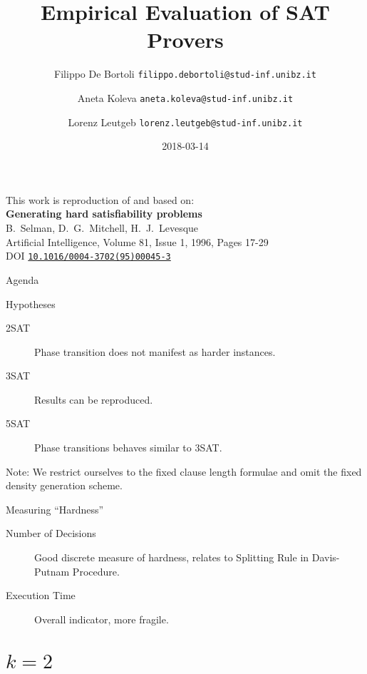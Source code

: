 \documentclass[xcolor={table,usenames,dvipsnames}]{beamer}
\title{Empirical Evaluation of SAT Provers}
\author{Filippo De Bortoli \texorpdfstring{\newline \texttt{\tiny filippo.debortoli@stud-inf.unibz.it} \newline }{<filippo.debortoli@stud-inf.unibz.it>}%
\and Aneta Koleva \texorpdfstring{\newline \texttt{\tiny aneta.koleva@stud-inf.unibz.it} \newline}{<aneta.koleva@stud-inf.unibz.it>}%
\and Lorenz Leutgeb \texorpdfstring{\newline \texttt{\tiny lorenz.leutgeb@stud-inf.unibz.it} \newline}{<lorenz.leutgeb@stud-inf.unibz.it>}}
\institute{Free University of Bozen-Bolzano}
\date{2018-03-14}
\begin{document}
\begin{frame}[plain]
\maketitle
\end{frame}

\begin{frame}[plain]
This work is reproduction of and based on:\\[3mm]

{\large\bfseries Generating hard satisfiability problems}\\[1mm]
B.\ Selman, D.\ G.\ Mitchell, H.\ J.\ Levesque\\[2mm]
Artificial Intelligence, Volume 81, Issue 1, 1996, Pages 17-29\\[1mm]
DOI \href{http://dx.doi.org/10.1016/0004-3702(95)00045-3}{\texttt{10.1016/0004-3702(95)00045-3}}\\[3mm]
{\small \color{gray}{(detailed reference in the end)}}
\end{frame}

\begin{frame}{Agenda}
\tableofcontents
\end{frame}

\begin{frame}{Hypotheses}
\begin{description}
	\item[2SAT]{Phase transition does not manifest as harder instances.}
    \item[3SAT]{Results can be reproduced.}
    \item[5SAT]{Phase transitions behaves similar to 3SAT.}
\end{description}

\alert{Note:} We restrict ourselves to the fixed clause length formulae and omit the fixed density generation scheme.
\end{frame}

\begin{frame}{Measuring \enquote{Hardness}}
\begin{description}
    \item[Number of Decisions]{Good discrete measure of hardness, relates to \alert{Splitting Rule}  in Davis-Putnam Procedure.}
	\item[Execution Time]{Overall indicator, more fragile.}
\end{description}
\end{frame}

\section{$k = 2$}
\end{document}
